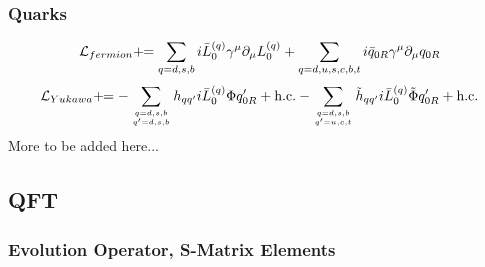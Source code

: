 \subsubsection{Quarks}


\begin{equation*}
  {\mathcal L}_{fermion}+\!\!= \sum_{q=d,s,b}i\bar L_0^{(q)}\gamma^\mu\partial_\mu L_0^{(q)} +\sum_{q=d,u,s,c,b,t}i\bar q_{0R}\gamma^\mu\partial_\mu q_{0R}
\end{equation*}
\begin{equation*}
  {\mathcal L}_{Yukawa}+\!\!= -\sum_{q=d,s,b\atop q'=d,s,b}h_{qq'}i\bar L_0^{(q)}\Phi q_{0R}'+\hbox{h.c.} -\sum_{q=d,s,b\atop q'=u,c,t}\tilde h_{qq'}i\bar L_0^{(q)}\tilde\Phi q_{0R}'+\hbox{h.c.}
\end{equation*}
More to be added here...

\subsection{QFT}

\subsubsection{Evolution Operator, S-Matrix Elements}

